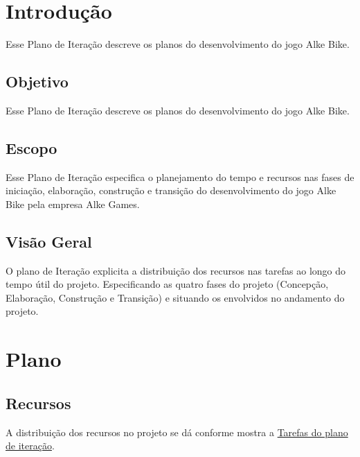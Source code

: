 \section{Introdução} 

Esse Plano de Iteração descreve os planos do desenvolvimento do jogo Alke Bike.

\subsection{Objetivo}

Esse Plano de Iteração descreve os planos do desenvolvimento do jogo Alke Bike.

\subsection{Escopo}

Esse Plano de Iteração especifica o planejamento do tempo e recursos nas fases de iniciação, elaboração, construção e transição do desenvolvimento do jogo Alke Bike pela empresa Alke Games.

\subsection{Visão Geral}

O plano de Iteração explicita a distribuição dos recursos nas tarefas ao longo do tempo útil do projeto. Especificando as quatro fases do projeto (Concepção, Elaboração, Construção e Transição) e situando os envolvidos no andamento do projeto.

\section{Plano}

\subsection{Recursos}

	A distribuição dos recursos no projeto se dá conforme mostra a \hyperlink{tarefasPlanoIteracao}{Tarefas do plano de iteraç\~ao}.

